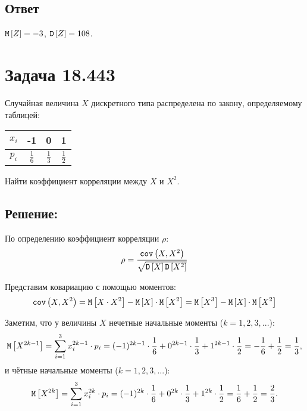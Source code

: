 \subsection*{Ответ}
$\mathtt{M} \left [ Z \right ] = -3$, $\mathtt{D} \left [ Z \right ] = 108$.

\section*{Задача 18.443}

Случайная величина $X$ дискретного типа распределена по закону, определяемому таблицей:

\begin{tabular}{|c|c|c|c|}
    \hline
    $x_i$ & -1            & 0             & 1             \\
    \hline
    $p_i$ & $\frac{1}{6}$ & $\frac{1}{3}$ & $\frac{1}{2}$ \\
    \hline
\end{tabular}

Найти коэффициент корреляции между $X$ и $X^2$.

\subsection*{Решение:}

По определению коэффициент корреляции $\rho$:
\begin{equation}
    \rho = \frac{\texttt{cov} \left ( X , X^2 \right )}{\sqrt{\mathtt{D} \left [ X \right ] \mathtt{D} \left [ X^2 \right ]}}
\end{equation}

Представим ковариацию с помощью моментов:
\begin{equation}
    \texttt{cov} \left ( X , X^2 \right )
    = \mathtt{M} \left [ X \cdot X^2 \right ] - \mathtt{M} \left [ X \right ] \cdot \mathtt{M} \left [ X^2 \right ]
    = \mathtt{M} \left [ X^3 \right ] - \mathtt{M} \left [ X \right ] \cdot \mathtt{M} \left [ X^2 \right ]
\end{equation}

Заметим, что у величины $X$ нечетные начальные моменты ($k=1,2,3,...$):
\begin{equation}
    \mathtt{M} \left [ X^{2k-1} \right ] = \sum_{i=1}^3 x_i^{2k-1} \cdot p_i = (-1)^{2k-1} \cdot \frac{1}{6} + 0^{2k-1} \cdot \frac{1}{3} + 1^{2k-1} \cdot \frac{1}{2} = - \frac{1}{6} + \frac{1}{2} = \frac{1}{3} ,
\end{equation}
и чётные начальные моменты ($k=1,2,3,...$):
\begin{equation}
    \mathtt{M} \left [ X^{2k} \right ] = \sum_{i=1}^3 x_i^{2k} \cdot p_i = (-1)^{2k} \cdot \frac{1}{6} + 0^{2k} \cdot \frac{1}{3} + 1^{2k} \cdot \frac{1}{2} = \frac{1}{6} + \frac{1}{2} = \frac{2}{3} .
\end{equation}

